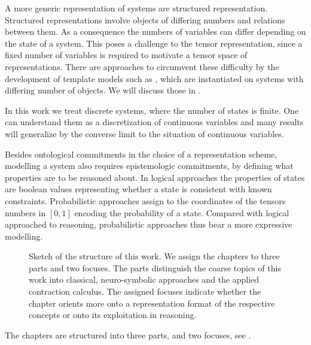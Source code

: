 A more generic representation of systems are structured representation.
Structured representations involve objects of differing numbers and relations between them.
As a consequence the numbers of variables can differ depending on the state of a system.
This poses a challenge to the tensor representation, since a fixed number of variables is required to motivate a tensor space of representations.
There are approaches to circumvent these difficulty by the development of template models such as \MarkovLogicNetworks{} \cite{richardson_markov_2006}, which are instantiated on systems with differing number of objects.
We will discuss those in .

In this work we treat discrete systems, where the number of states is finite.
One can understand them as a discretization of continuous variables and many results will generalize by the converse limit to the situation of continuous variables.

Besides ontological commitments in the choice of a representation scheme, modelling a system also requires epistemologic commitments, by defining what properties are to be reasoned about.
In logical approaches the properties of states are boolean values representing whether a state is consistent with known constraints.
Probabilistic approaches assign to the coordinates of the tensors numbers in $[0,1]$ encoding the probability of a state.
Compared with logical approached to reasoning, probabilistic approaches thus bear a more expressive modelling.


\begin{figure}[hbt!]
    
    \caption{Sketch of the structure of this work.
        We assign the chapters to three parts and two focuses.
        The parts distinguish the coarse topics of this work into classical, neuro-symbolic approaches and the applied contraction calculus.
        The assigned focuses indicate whether the chapter orients more onto a representation format of the respective concepts or onto its exploitation in reasoning.}
    \label{fig:chapterOverview}
\end{figure}
The chapters are structured into three parts, and two focuses, see .

